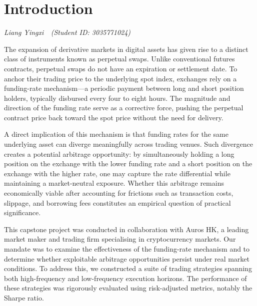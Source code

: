 \documentclass[10pt,twocolumn,a4paper]{article}
\newcommand{\partauthor}[2]{%
  \begingroup\par\vspace{-2pt}%
  {\small\itshape #1\ \ (Student ID: #2)}\par\vspace{4pt}\endgroup}
\begin{document}
\section{Introduction}
\label{sec:intro}
\partauthor{Liang Yingxi}{3035771024}

The expansion of derivative markets in digital assets has given rise to a
distinct class of instruments known as perpetual swaps.  Unlike
conventional futures contracts, perpetual swaps do not have an expiration
or settlement date.  To anchor their trading price to the underlying spot
index, exchanges rely on a funding-rate mechanism---a periodic payment
between long and short position holders, typically disbursed every four to
eight hours.  The magnitude and direction of the funding rate serve as a
corrective force, pushing the perpetual contract price back toward the
spot price without the need for delivery.

A direct implication of this mechanism is that funding rates for the same
underlying asset can diverge meaningfully across trading venues.  Such
divergence creates a potential arbitrage opportunity: by simultaneously
holding a long position on the exchange with the lower funding rate and a
short position on the exchange with the higher rate, one may capture the
rate differential while maintaining a market-neutral exposure.  Whether
this arbitrage remains economically viable after accounting for frictions
such as transaction costs, slippage, and borrowing fees constitutes an
empirical question of practical significance.

This capstone project was conducted in collaboration with Auros HK, a
leading market maker and trading firm specialising in cryptocurrency
markets.  Our mandate was to examine the effectiveness of the
funding-rate mechanism and to determine whether exploitable arbitrage
opportunities persist under real market conditions.  To address this, we
constructed a suite of trading strategies spanning both high-frequency and
low-frequency execution horizons.  The performance of these strategies was
rigorously evaluated using risk-adjusted metrics, notably the Sharpe
ratio.
\end{document}
